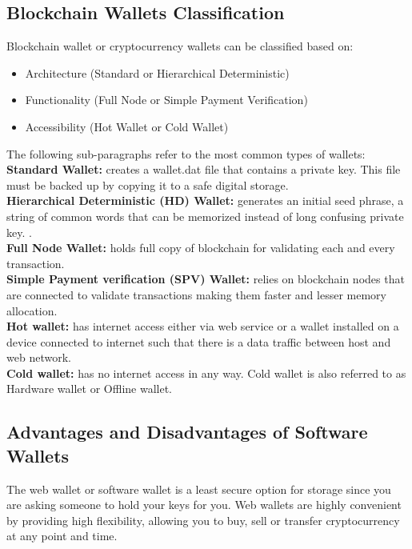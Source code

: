 \documentclass[conference]{IEEEtran}
\begin{document}
\subsection{Blockchain Wallets Classification}
Blockchain wallet or cryptocurrency wallets can be classified based on: \begin{itemize}
    \item Architecture (Standard or Hierarchical Deterministic)
    \item Functionality (Full Node or Simple Payment Verification)
    \item Accessibility (Hot Wallet or Cold Wallet)
\end{itemize} 
The following sub-paragraphs refer to the most common types of wallets: \\
\textbf{Standard Wallet:} creates a wallet.dat file that contains a private key\cite{shaik2020securing}. This file must be backed up by copying 
it to a safe digital storage. \\
\textbf{Hierarchical Deterministic (HD) Wallet:} generates an initial seed phrase, a string of common words that can be memorized instead 
of long confusing private key. \cite{ahamad2013survey}. \\ 
\textbf{Full Node Wallet:} holds full copy of blockchain for validating each and every transaction\cite{dai2018sblwt}. \\
\textbf{Simple Payment verification (SPV) Wallet:} relies on blockchain nodes that are connected to validate transactions making them faster 
and lesser memory allocation\cite{dai2018sblwt}. \\
\textbf{Hot wallet:} has internet access either via web service or a wallet installed on a device connected to internet such that there 
is a data traffic between host and web network\cite{das2019formal}. \\
\textbf{Cold wallet:} has no internet access in any way. Cold wallet is also referred to as Hardware wallet or Offline wallet\cite{das2019formal}.


\subsection{Advantages and Disadvantages of Software Wallets}
The web wallet or software wallet is a least secure option for storage since you are asking someone to hold your keys for you. Web wallets 
are highly convenient by providing high flexibility, allowing you to buy, sell or transfer cryptocurrency at any point and time\cite{jokic2019comparative}. 
\end{document}
